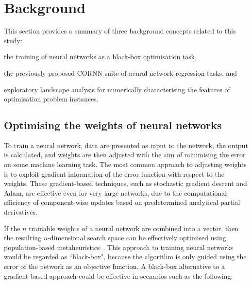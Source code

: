 \documentclass[acmsmall,screen,review,anonymous]{acmart}
\begin{document}
\section{Background}\label{sec:Background}
This section provides a summary of three background concepts related to this study:
\begin{inparaenum}[(a)]
    \item the training of neural networks as a black-box optimisation task, 
    \item the previously proposed CORNN suite of neural network regression tasks, and 
    \item exploratory landscape analysis for numerically characterising the features of optimisation problem instances.
\end{inparaenum}

\subsection{Optimising the weights of neural networks}\label{sec:NN_training}
To train a neural network, data are presented as input to the network, the output is calculated, and weights are then adjusted with the aim of minimising the error on some machine learning task. The most common approach to adjusting weights is to exploit gradient information of the error function with respect to the weights. These gradient-based techniques, such as stochastic gradient descent and Adam, are effective even for very large networks, due to the computational efficiency of component-wise updates based on predetermined analytical partial derivatives. 

If the $n$ trainable weights of a neural network are combined into a vector, then the resulting $n$-dimensional search space can be effectively optimised using population-based metaheuristics~\cite{MOUS2020,SOCH2007,VAND2000}. This approach to training neural networks would be regarded as ``black-box", because the algorithm is only guided using the error of the network as an objective function. A black-box alternative to a gradient-based approach could be effective in scenarios such as the following:
\end{document}
